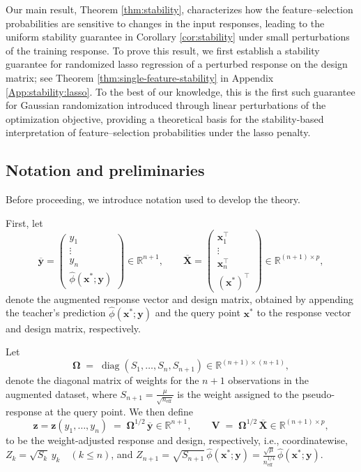 \documentclass[12pt]{article}
\newcommand{\R}{\mathbb{R}}
\newcommand{\Xbar}{\overline{X}}
\newcommand{\ybar}{\overline{y}}
\newcommand{\neff}{n_{\mathrm{eff}}}
\newcommand{\Om}{\Omega}
\newcommand{\diag}{\operatorname{diag}}
\theoremstyle{definition}
\begin{document}
Our main result, Theorem \ref{thm:stability}, characterizes how the feature--selection probabilities are sensitive to changes in the input responses, leading to the uniform stability guarantee in Corollary \ref{cor:stability} under small perturbations of the training response.
To prove this result, we first establish a stability guarantee for randomized lasso regression of a perturbed response on the design matrix; see Theorem \ref{thm:single-feature-stability} in Appendix \ref{App:stability:lasso}.
To the best of our knowledge, this is the first such guarantee for Gaussian randomization introduced through linear perturbations of the optimization objective, providing a theoretical basis for the stability-based interpretation of feature--selection probabilities under the lasso penalty.

\subsection{Notation and preliminaries}
Before proceeding, we introduce notation used to develop the theory.

First, let 
\begin{equation*}
  \bm{\ybar} = \begin{pmatrix} y_1 \\ \vdots \\ y_n \\ \hat\phi(\bm{x}^*; \bm{y})\end{pmatrix}
  \in \R^{n+1},
  \qquad
  \bm{\Xbar} = \begin{pmatrix} \bm{x}_1^{\top} \\ \vdots \\ \bm{x}_n^{\top} \\ (\bm{x}^{\ast})^{\top}\end{pmatrix}
  \in \R^{(n+1)\times p},
\end{equation*}
denote the augmented response vector and design matrix, obtained by appending the teacher's prediction $\hat\phi(\bm{x}^*; \bm{y})$ and the query point $\bm{x}^*$ to the response vector and design matrix, respectively. 


Let 
\begin{equation*}
  \bm{\Om} \;=\; \diag\!\left(S_1, \dots, S_n, S_{n+1}\right)
  \in \R^{(n+1)\times(n+1)},
\end{equation*}
denote the diagonal matrix of weights for the $n+1$ observations in the augmented dataset, where $S_{n+1}=\frac{\mu}{\sqrt{n_{\mathrm{eff}}}}$ is the weight assigned to the pseudo-response at the query point.
We then define
\begin{equation}
\label{eq:whitened}
  \bm{z}= \bm{z}(y_1,\ldots, y_n) \;=\; \bm{\Om}^{1/2}\,\bm{\ybar} \in \R^{n+1},
  \qquad
  \bm{V} \;=\; \bm{\Om}^{1/2}\,\bm{\Xbar} \in \R^{(n+1)\times p} ,
\end{equation}
to be the weight-adjusted response and design, respectively, i.e.,  coordinatewise, $Z_k = \sqrt{S_k}\, y_k \quad (k \le n)$, and $Z_{n+1} = \sqrt{S_{n+1}} \, \hat\phi(\bm{x}^*; \bm{y}) = \frac{\sqrt{\mu}}{\neff^{1/4}}\, \hat\phi(\bm{x}^*; \bm{y})$.
\end{document}
